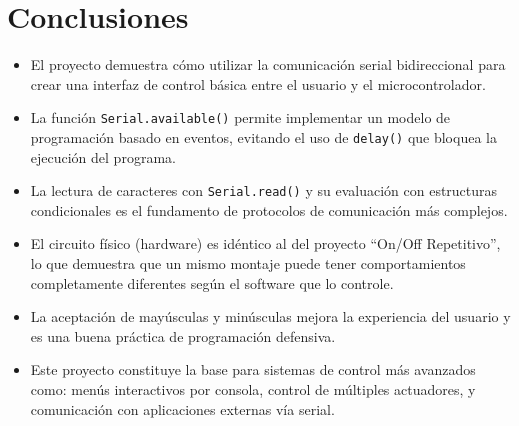 \documentclass[12pt,a4paper]{article}
\begin{document}
\section{Conclusiones}

\begin{itemize}
    \item El proyecto demuestra cómo utilizar la comunicación serial bidireccional para crear una interfaz de control básica entre el usuario y el microcontrolador.
    \item La función \texttt{Serial.available()} permite implementar un modelo de programación basado en eventos, evitando el uso de \texttt{delay()} que bloquea la ejecución del programa.
    \item La lectura de caracteres con \texttt{Serial.read()} y su evaluación con estructuras condicionales es el fundamento de protocolos de comunicación más complejos.
    \item El circuito físico (hardware) es idéntico al del proyecto ``On/Off Repetitivo'', lo que demuestra que un mismo montaje puede tener comportamientos completamente diferentes según el software que lo controle.
    \item La aceptación de mayúsculas y minúsculas mejora la experiencia del usuario y es una buena práctica de programación defensiva.
    \item Este proyecto constituye la base para sistemas de control más avanzados como: menús interactivos por consola, control de múltiples actuadores, y comunicación con aplicaciones externas vía serial.
\end{itemize}
\end{document}
